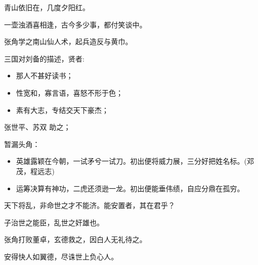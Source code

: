 \documentclass[UTF8,a4paper,8pt]{ctexart}
\begin{document}
			青山依旧在，几度夕阳红。
			
			一壶浊酒喜相逢，古今多少事，都付笑谈中。

			张角学之南山仙人术，起兵造反与黄巾。
			
			三国对刘备的描述，贤者:
			\begin{itemize}
				\item  那人不甚好读书；
				\item  性宽和，寡言语，喜怒不形于色；
				\item  素有大志，专结交天下豪杰；
			\end{itemize}
			张世平、苏双 助之；
			
			暂漏头角：
			\begin{itemize}
				\item 英雄露颖在今朝，一试矛兮一试刀。初出便将威力展，三分好把姓名标。(邓茂，程远志)
				\item 运筹决算有神功，二虎还须逊一龙。初出便能垂伟绩，自应分鼎在孤穷。
			\end{itemize}
			
			天下将乱，非命世之才不能济。能安置者，其在君乎？
			
			子治世之能臣，乱世之奸雄也。
			
			张角打败董卓，玄德救之，因白人无礼待之。
			
			安得快人如翼德，尽诛世上负心人。
			
\end{document}
